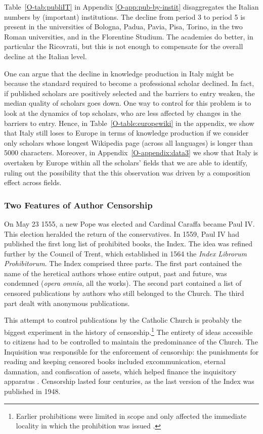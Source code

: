 Table~\ref{O-tab:publiIT} in Appendix \ref{O-app:pub-by-instit} disaggregates the Italian numbers by (important) institutions. The decline from period 3 to period 5 is present in the universities of Bologna, Padua,  Pavia,  Pisa, Torino, in the two Roman universities, and in the Florentine Studium. The academies do better, in particular the Ricovrati, but this is not enough to compensate for the overall decline at the Italian level.



One can argue that the decline in knowledge production in Italy might be because the standard required to become a professional scholar declined. In fact, if published scholars are positively selected and the barriers to entry weaken, the median quality of scholars goes down. One way to control for this problem is to look at the dynamics of top scholars, who are less affected by changes in the barriers to entry. Hence, in Table~\ref{O-table:europewiki} in the appendix, we show that Italy still loses to Europe in terms of knowledge production if we consider only scholars whose longest Wikipedia page (across all languages) is longer than 5000 characters. Moreover, in Appendix~\ref{O-appendix:data3} we show that Italy is overtaken by Europe within all the scholars' fields that we are able to identify, ruling out the possibility that the this observation was driven by a composition effect across fields.




\subsubsection*{Two Features of Author Censorship}\label{section:twof}

On May 23 1555, a new Pope was elected and Cardinal Caraffa became Paul IV. This election heralded the return of the conservatives. In 1559, Paul IV had published the first long list of prohibited books, the Index. The idea was refined further by the Council of Trent, which established in 1564 the \textit{Index Librorum Prohibitorum}. The Index comprised three parts. The first part contained the name of the heretical authors whose entire output, past and future, was condemned (\textit{opera omnia}, all the works). The second part contained a list of censored publications by authors who still belonged to the Church. The third part dealt with anonymous publications.

This attempt to control publications by the Catholic Church is probably the biggest experiment in the history of censorship.\footnote{Earlier prohibitions were limited in scope and only affected the immediate locality in which the prohibition was issued \cite{putnam1906}.} The entirety of ideas accessible to citizens had to be controlled to maintain the predominance of the Church. The Inquisition was responsible for the enforcement of censorship: the punishments for reading and keeping censored books included excommunication, eternal damnation, and confiscation of assets, which helped finance the inquisitory apparatus \cite{maifreda2014denari}. Censorship lasted four centuries, as the last version of the Index was published in 1948.



